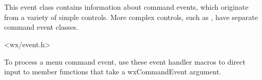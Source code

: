 \section{}\label{wxcommandevent}

This event class contains information about command events, which originate from a variety of
simple controls. More complex controls, such as , have separate command event classes.




<wx/event.h>




To process a menu command event, use these event handler macros to direct input to member
functions that take a wxCommandEvent argument.

